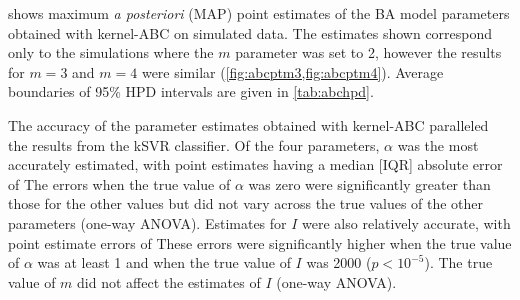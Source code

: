 \documentclass[12pt]{article}\usepackage[]{graphicx}\usepackage[]{color}
\begin{document}
%
%

 shows maximum \textit{a posteriori} (MAP) point
estimates of the BA model parameters obtained with kernel-ABC on simulated
data. The estimates shown correspond only to the simulations where the $m$
parameter was set to 2, however the results for $m = 3$ and $m = 4$ were
similar (\cref{fig:abcptm3,fig:abcptm4}). Average boundaries of 95\% HPD
intervals are given in \cref{tab:abchpd}.

The accuracy of the parameter estimates obtained with kernel-ABC
paralleled the results from the kSVR classifier. Of the four parameters,
$\alpha$ was the most accurately estimated, with point estimates having a
median [IQR] absolute error of 
The errors when the true value of $\alpha$ was zero were significantly greater
than those for the other values 
but did not vary across the true values of the other parameters (one-way
ANOVA). Estimates for $I$ were also relatively accurate, with point estimate
errors of
These errors were significantly higher when the true value of $\alpha$ was
at least 1
and when the true value of $I$ was 2000 ($p < 10^{-5}$). The true value of $m$
did not affect the estimates of $I$ (one-way ANOVA).
\end{document}
